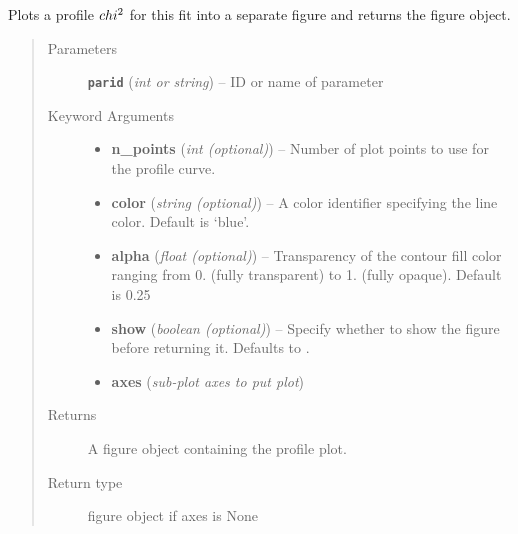 \documentclass[a4paper,10pt,english]{sphinxmanual}
\begin{document}
\begin{fulllineitems}
\begin{fulllineitems}
\end{fulllineitems}


\begin{fulllineitems}
\label{index:kafe.fit.Fit.plot_profile}
Plots a profile \(\\chi^2\) for this fit into
a separate figure and returns the figure object.
\begin{quote}\begin{description}
\item[{Parameters}] \leavevmode
\textbf{\texttt{parid}} (\emph{int or string}) -- ID or name of parameter

\item[{Keyword Arguments}] \leavevmode\begin{itemize}
\item {} 
\textbf{n\_points} (\emph{int (optional)}) --
Number of plot points to use for the profile curve.

\item {} 
\textbf{color} (\emph{string (optional)}) --
A  color identifier specifying the line
color. Default is `blue'.

\item {} 
\textbf{alpha} (\emph{float (optional)}) --
Transparency of the contour fill color ranging from 0. (fully
transparent) to 1. (fully opaque). Default is 0.25

\item {} 
\textbf{show} (\emph{boolean (optional)}) --
Specify whether to show the figure before returning it. Defaults
to .

\item {} 
\textbf{axes} (\emph{sub-plot axes to put plot})

\end{itemize}

\item[{Returns}] \leavevmode
A figure object containing the profile plot.

\item[{Return type}] \leavevmode
{} figure object if axes is None

\end{description}\end{quote}


\end{fulllineitems}
\end{fulllineitems}
\end{document}
